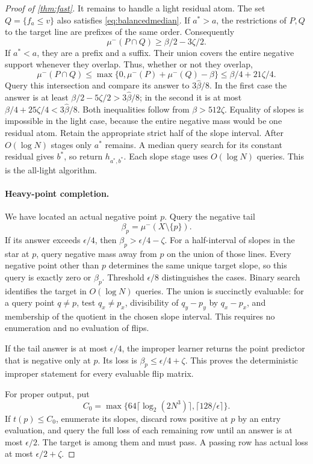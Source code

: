 \begin{proof}[Proof of \cref{thm:fast}]
It remains to handle a light residual atom. The set $Q=\{f_a\le v\}$ also satisfies \eqref{eq:balancedmedian}. If $a^*>a$, the restrictions of $P,Q$ to the target line are prefixes of the same order. Consequently
\[
 \mu^-(P\cap Q)\ge\beta/2-3\zeta/2.
\]
If $a^*<a$, they are a prefix and a suffix. Their union covers the entire negative support whenever they overlap. Thus, whether or not they overlap,
\[
 \mu^-(P\cap Q)
 \le\max\{0,\mu^-(P)+\mu^-(Q)-\beta\}
 \le\beta/4+21\zeta/4.
\]
Query this intersection and compare its answer to $3\widehat\beta/8$. In the first case the answer is at least $\beta/2-5\zeta/2>3\widehat\beta/8$; in the second it is at most $\beta/4+25\zeta/4<3\widehat\beta/8$. Both inequalities follow from $\beta>512\zeta$. Equality of slopes is impossible in the light case, because the entire negative mass would be one residual atom. Retain the appropriate strict half of the slope interval. After $O(\log N)$ stages only $a^*$ remains. A median query search for its constant residual gives $b^*$, so return $h_{a^*,b^*}$. Each slope stage uses $O(\log N)$ queries. This is the all-light algorithm.

\paragraph{Heavy-point completion.}
We have located an actual negative point $p$. Query the negative tail
\[
 \beta_p=\mu^-(X\setminus\{p\}).
\]
If its answer exceeds $\epsilon/4$, then $\beta_p>\epsilon/4-\zeta$. For a half-interval of slopes in the star at $p$, query negative mass away from $p$ on the union of those lines. Every negative point other than $p$ determines the same unique target slope, so this query is exactly zero or $\beta_p$. Threshold $\epsilon/8$ distinguishes the cases. Binary search identifies the target in $O(\log N)$ queries. The union is succinctly evaluable: for a query point $q\ne p$, test $q_x\ne p_x$, divisibility of $q_y-p_y$ by $q_x-p_x$, and membership of the quotient in the chosen slope interval. This requires no enumeration and no evaluation of flips.

If the tail answer is at most $\epsilon/4$, the improper learner returns the point predictor that is negative only at $p$. Its loss is $\beta_p\le\epsilon/4+\zeta$. This proves the deterministic improper statement for every evaluable flip matrix.

For proper output, put
\[
 C_0=\max\{64\lceil\log_2(2N^3)\rceil,\lceil128/\epsilon\rceil\}.
\]
If $t(p)\le C_0$, enumerate its slopes, discard rows positive at $p$ by an entry evaluation, and query the full loss of each remaining row until an answer is at most $\epsilon/2$. The target is among them and must pass. A passing row has actual loss at most $\epsilon/2+\zeta$.


\end{proof}
